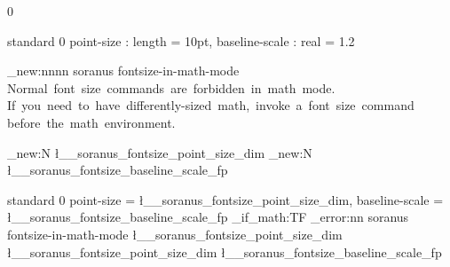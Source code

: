 %
%
%
% 
%


%

 { 0 }


 { standard } { 0 }
  {
    point-size     : length  = 10pt,
    baseline-scale : real    = 1.2
  }


\msg_new:nnnn { soranus } { fontsize-in-math-mode }
  { Normal~font~size~commands~are~forbidden~in~math~mode. }
  {
    If~you~need~to~have~differently-sized~math,~invoke~a~font~size~command~
    before~the~math~environment.
  }


%


\dim_new:N \l__soranus_fontsize_point_size_dim
\fp_new:N \l__soranus_fontsize_baseline_scale_fp


 { standard } { 0 }
  {
    point-size     = \l__soranus_fontsize_point_size_dim,
    baseline-scale = \l__soranus_fontsize_baseline_scale_fp
  }
  {
    \mode_if_math:TF
      { \msg_error:nn { soranus } { fontsize-in-math-mode } }
      {
        \AssignTemplateKeys
        \fontsize
          \l__soranus_fontsize_point_size_dim
          {
            \ScaleToNearestTenthPoint
              { \l__soranus_fontsize_point_size_dim }
              { \l__soranus_fontsize_baseline_scale_fp }
          }
        \selectfont
      }
  }


%

